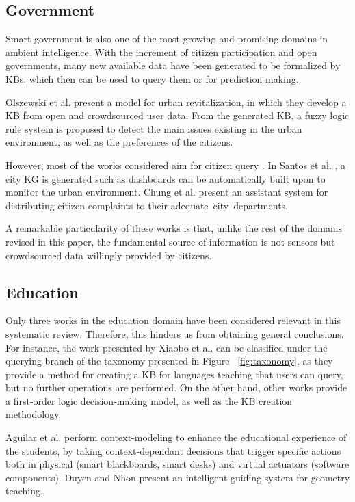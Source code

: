 \subsection{Government} 
Smart government is also one of the most growing and promising domains in ambient intelligence. With the increment of citizen participation and open governments, many new available data have been generated to be formalized by KBs, which then can be used to query them or for prediction making. 

Olszewski et al. \citep{Olzewskietal} present a model for urban revitalization, in which they develop a KB from open and crowdsourced user data. From the generated KB, a fuzzy logic rule system is proposed to detect the main issues existing in the urban environment, as well as the preferences of the citizens. 

However, most of the works considered aim for citizen query \citep{santosetal,chungetal,zhouetal}. In Santos et al. \citep{santosetal}, a city KG is generated such as dashboards can be automatically built upon to monitor the urban environment. Chung et al. \citep{chungetal} present an assistant system for distributing citizen complaints to their adequate~city~departments. 

A remarkable particularity of these works is that, unlike the rest of the domains revised in this paper, the fundamental source of information is not sensors but crowdsourced data willingly provided by citizens.


\subsection{Education}
Only three works in the education domain have been considered relevant in this systematic review. Therefore, this hinders us from obtaining general conclusions.  For instance, the work presented by Xiaobo et al. \citep{xiaoboetal} can be classified under the querying branch of the taxonomy presented in Figure~ \ref{fig:taxonomy}, as they provide a method for creating a KB for languages teaching that users can query, but no further operations are performed. On the other hand, other works \citep{duyenandnhon, aguilaretal} provide a first-order logic decision-making model, as well as the KB creation methodology. 

Aguilar et al. \citep{aguilaretal} perform context-modeling to enhance the educational experience of the students, by taking context-dependant decisions that trigger specific actions both in physical (smart blackboards, smart desks) and virtual actuators (software components). Duyen and Nhon \citep{duyenandnhon} present an intelligent guiding system for geometry teaching.

